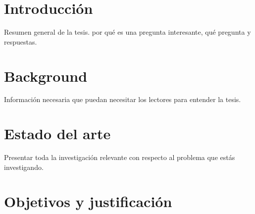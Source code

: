 \documentclass[11pt,a4paper,twoside]{tesis}
\begin{document}

\def\autor{Fernando Gasperi Jabalera}
\def\tituloTesis{Refactorings automáticos de alto nivel}
\def\runtitulo{Refactorings automáticos de alto nivel}
\def\runtitle{High level automated refactorings}
\def\director{Hernán Wilkinson}
\def\lugar{Buenos Aires, 2020}


\frontmatter
\pagestyle{empty}


\cleardoublepage

\cleardoublepage

\cleardoublepage

\cleardoublepage
\tableofcontents

\mainmatter
\pagestyle{headings}


\chapter{Introducción}
Resumen general de la tesis. por qué es una pregunta interesante, qué pregunta y respuestas.


\chapter{Background}
Información necesaria que puedan necesitar los lectores para entender la tesis.


\chapter{Estado del arte}
Presentar toda la investigación relevante con respecto al problema que estás investigando.


\chapter{Objetivos y justificación}


\backmatter
%
\end{document}
